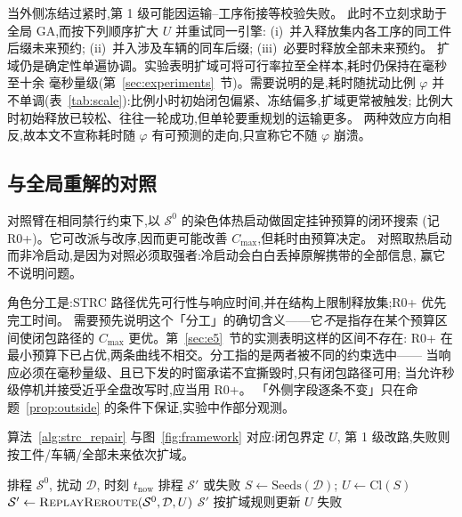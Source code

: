 \documentclass[manuscript,screen,review]{acmart}
\providecommand{\STRC}{\textsc{STRC}}
\begin{document}
当外侧冻结过紧时,第 1 级可能因运输--工序衔接等校验失败。
此时不立刻求助于全局 GA,而按下列顺序扩大 \(U\) 并重试同一引擎:
(i)~并入释放集内各工序的同工件后缀未来预约;
(ii)~并入涉及车辆的同车后缀;
(iii)~必要时释放全部未来预约。
扩域仍是确定性单遍协调。实验表明扩域可将可行率拉至全样本,耗时仍保持在毫秒至十余
毫秒量级(第~\ref{sec:experiments}~节)。需要说明的是,耗时随扰动比例 \(\varphi\)
并不单调(表~\ref{tab:scale}):比例小时初始闭包偏紧、冻结偏多,扩域更常被触发;
比例大时初始释放已较松、往往一轮成功,但单轮要重规划的运输更多。
两种效应方向相反,故本文不宣称耗时随 \(\varphi\) 有可预测的走向,只宣称它不随
\(\varphi\) 崩溃。

\subsection{与全局重解的对照}
\label{sec:vs_r0}

对照臂在相同禁行约束下,以 \(\mathcal{S}^0\) 的染色体热启动做固定挂钟预算的闭环搜索
(记 R0+)。它可改派与改序,因而更可能改善 \(C_{\max}\),但耗时由预算决定。
对照取热启动而非冷启动,是因为对照必须取强者:冷启动会白白丢掉原解携带的全部信息,
赢它不说明问题。

角色分工是:\STRC{} 路径优先可行性与响应时间,并在结构上限制释放集;R0+ 优先完工时间。
需要预先说明这个「分工」的确切含义——它\emph{不}是指存在某个预算区间使闭包路径的
\(C_{\max}\) 更优。第~\ref{sec:e5}~节的实测表明这样的区间不存在:
R0+ 在最小预算下已占优,两条曲线不相交。分工指的是两者被不同的约束选中——
当响应必须在毫秒量级、且已下发的时窗承诺不宜撕毁时,只有闭包路径可用;
当允许秒级停机并接受近乎全盘改写时,应当用 R0+。
「外侧字段逐条不变」只在命题~\ref{prop:outside} 的条件下保证,实验中作部分观测。

算法~\ref{alg:strc_repair} 与图~\ref{fig:framework} 对应:闭包界定 \(U\),
第 1 级改路,失败则按工件/车辆/全部未来依次扩域。

\begin{algorithm}[t]
\caption{基于 \STRC{} 的有界恢复(第 1 级 + 扩域)}
\label{alg:strc_repair}
\begin{algorithmic}[1]
\Require 排程 \(\mathcal{S}^0\), 扰动 \(\mathcal{D}\), 时刻 \(t_{\mathrm{now}}\)
\Ensure 排程 \(\mathcal{S}'\) 或失败
\State \(S \gets \mathrm{Seeds}(\mathcal{D})\);
      \(U \gets \mathrm{Cl}(S)\)
  \State \(\mathcal{S}' \gets \textsc{ReplayReroute}(\mathcal{S}^0,\mathcal{D},U)\)
    \State \Return \(\mathcal{S}'\)
  \EndIf
  \State 按扩域规则更新 \(U\) 
\EndFor
\State \Return 失败
\end{algorithmic}
\end{algorithm}
\end{document}
